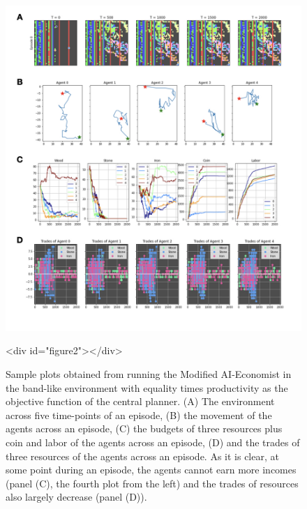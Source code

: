 \documentclass{article}
\begin{document}
\begin{figure}
\centering
\includegraphics[width=0.7\linewidth]{"A_Multi-agent_Reinforcement_Learning_Study_of_Emergence_of_Social_Classes_out_of_Arbitrary_Governance_The_Role_of_Environment_Slides_2/A_Multi-agent_Reinforcement_Learning_Study_of_Emergence_of_Social_Classes_out_of_Arbitrary_Governance_The_Role_of_Environment_Slides_2.001"}
\caption{Sample plots obtained from running the Modified AI-Economist in the band-like environment with equality times productivity as the objective function of the central planner. (A) The environment across five time-points of an episode, (B) the movement of the agents across an episode, (C) the budgets of three resources plus coin and labor of the agents across an episode, (D) and the trades of three resources of the agents across an episode. As it is clear, at some point during an episode, the agents cannot earn more incomes (panel (C), the fourth plot from the left) and the trades of resources also largely decrease (panel (D)).}
<div id="figure2"></div>

\end{figure}
\end{document}
